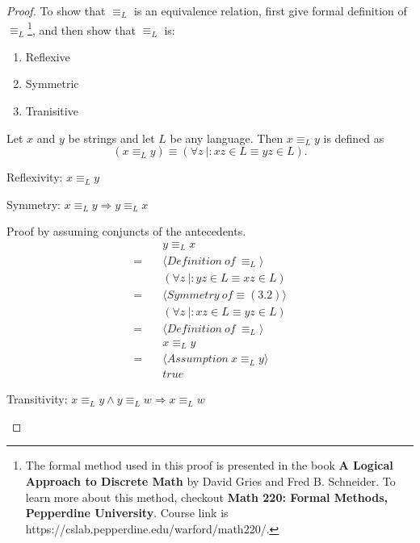 \documentclass[11pt]{article}
\newenvironment{theorem}[2][Theorem]{\begin{trivlist}
\item[\hskip \labelsep {\bfseries #1}\hskip \labelsep {\bfseries #2.}]}{\end{trivlist}}
\newenvironment{problem}[2][Problem]{\begin{trivlist}
\item[\hskip \labelsep {\bfseries #1}\hskip \labelsep {\bfseries #2.}]}{\end{trivlist}}
\begin{document}
\begin{proof}
To show that $\equiv_{L}$ is an equivalence relation, first give formal definition of $\equiv_{L}$\footnote{The formal method used in this proof is presented in the book \textbf{A Logical Approach
to Discrete Math} by David Gries and Fred B. Schneider. To learn more about this method, checkout \textbf{Math 220: Formal Methods, Pepperdine University}. Course link is https://cslab.pepperdine.edu/warford/math220/.}, and then show that $\equiv_{L}$ is:
\begin{enumerate}
\item Reflexive
\item Symmetric
\item Tranisitive
\end{enumerate}
\begin{theorem}[Definition]{$\equiv_{L}$} 
Let $x$ and $y$ be strings and let $L$ be any language. Then $x \equiv_{L} y$ is defined as
\[
(x \equiv_{L} y) \equiv (\forall z \ |: xz \in L \equiv yz \in L).
\]
\end{theorem}

\begin{problem}[Part]{1}
Reflexivity: $x \equiv_{L} y$
\end{problem}

\begin{problem}[Part]{2}
Symmetry: $x \equiv_{L} y \Rightarrow y \equiv_{L} x$
\end{problem}
Proof by assuming conjuncts of the antecedents.
\begin{align*}
&\quad y \equiv_{L} x \\
= &\quad \langle Definition \ of \ \equiv_{L} \rangle \\
&\quad (\forall z \ |: yz \in L \equiv xz \in L) \\
= &\quad \langle Symmetry \ of \equiv (3.2) \rangle \\
&\quad (\forall z \ |: xz \in L \equiv yz \in L) \\
= &\quad \langle Definition \ of \ \equiv_{L} \rangle \\
&\quad x \equiv_{L} y \\
= &\quad \langle Assumption \ x \equiv_{L} y \rangle \\
&\quad true
\end{align*}

\begin{problem}[Part]{3}
Transitivity: $x \equiv_{L} y \wedge y \equiv_{L} w \Rightarrow x \equiv_{L} w$
\end{problem}
\end{proof}
\end{document}

